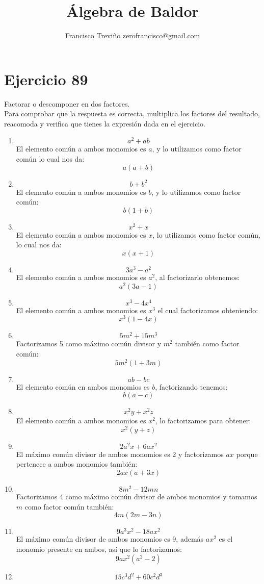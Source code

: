 \documentclass[12pt]{article}
\title{Álgebra de Baldor}
\author{Francisco Treviño zerofrancisco@gmail.com}
\begin{document}
\maketitle

\section*{Ejercicio 89}
Factorar o descomponer en dos factores.\\
Para comprobar que la respuesta es correcta, multiplica los factores del resultado, reacomoda y verifica que tienes la expresión dada en el ejercicio.

\begin{enumerate}[label=\bfseries Ejercicio \arabic*:]
  \item $$a^2 + ab$$
El elemento común a ambos monomios es $a$, y lo utilizamos como factor común lo cual nos da:
$$a(a + b)$$
  \item $$b + b^2$$
El elemento común a ambos monomios es $b$, y lo utilizamos como factor común:
$$b(1+b)$$
  \item $$x^2 + x$$
El elemento común a ambos monomios es $x$, lo utilizamos como factor común, lo cual nos da:
$$x(x+1)$$
  \item $$3a^3 - a^2$$
El elemento común a ambos monomios es $a^2$, al factorizarlo obtenemos:
$$a^2(3a - 1)$$
  \item $$x^3 - 4x^4$$
El elemento común a ambos monomios es $x^3$ el cual factorizamos obteniendo:
$$x^3(1 - 4x)$$
  \item $$5m^2 + 15m^3$$
Factorizamos 5 como máximo común divisor y $m^2$ también como factor común:
$$5m^2(1 + 3m)$$
  \item $$ab - bc$$
El elemento común en ambos monomios es $b$, factorizando tenemos:
$$b(a-c)$$
  \item $$x^2y + x^2z$$
El elemento común a ambos monomios es $x^2$, lo factorizamos para obtener:
$$x^2(y + z)$$
  \item $$2a^2x + 6ax^2$$
El máximo común divisor de ambos monomios es 2 y factorizamos $ax$ porque pertenece a ambos monomios también:
$$2ax(a + 3x)$$
  \item $$8m^2 - 12mn$$
Factorizamos 4 como máximo común divisor de ambos monomios y tomamos $m$ como factor común también:
$$4m(2m - 3n)$$
  \item $$9a^3x^2 - 18ax^2$$
El máximo común divisor de ambos monomios es 9, además $ax^2$ es el monomio presente en ambos, así que lo factorizamos:
$$9ax^2(a^2 -2)$$
  \item $$15c^3d^2 + 60c^2d^3$$

\end{enumerate}
\end{document}
